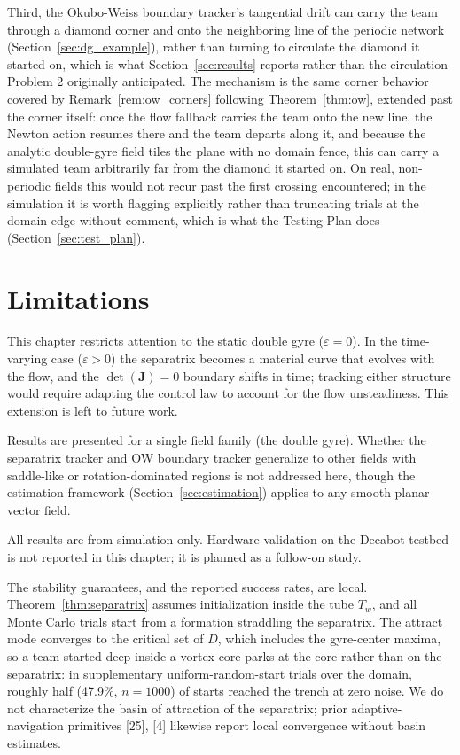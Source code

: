 \documentclass[12pt, letterpaper, oneside]{report}
\begin{document}
Third, the Okubo-Weiss boundary tracker's tangential drift can carry the
team through a diamond corner and onto the neighboring line of the
periodic network (Section~\ref{sec:dg_example}), rather than turning to
circulate the diamond it started on, which is what
Section~\ref{sec:results} reports rather than the circulation Problem 2
originally anticipated. The mechanism is the same corner behavior
covered by Remark~\ref{rem:ow_corners} following Theorem~\ref{thm:ow},
extended past the corner itself: once the flow fallback carries the team
onto the new line, the Newton action resumes there and the team departs
along it, and because the analytic double-gyre field tiles the plane
with no domain fence, this can carry a simulated team arbitrarily far
from the diamond it started on. On real, non-periodic fields this
would not recur past the first crossing encountered; in the simulation
it is worth flagging explicitly rather than truncating trials at the
domain edge without comment, which is what the Testing Plan does
(Section~\ref{sec:test_plan}).

\section{Limitations}
\label{sec:limitations}

This chapter restricts attention to the static double gyre ($\varepsilon = 0$).
In the time-varying case ($\varepsilon > 0$) the separatrix becomes a
material curve that evolves with the flow, and the $\det(\mathbf{J}) = 0$
boundary shifts in time; tracking either structure would require adapting
the control law to account for the flow unsteadiness. This extension is
left to future work.

Results are presented for a single field family (the double gyre). Whether
the separatrix tracker and OW boundary tracker generalize to other fields
with saddle-like or rotation-dominated regions is not addressed here,
though the estimation framework (Section~\ref{sec:estimation}) applies
to any smooth planar vector field.

All results are from simulation only. Hardware validation on the Decabot
testbed is not reported in this chapter; it is planned as a follow-on study.

The stability guarantees, and the reported success rates, are local.
Theorem~\ref{thm:separatrix} assumes initialization inside the tube
$T_w$, and all Monte Carlo trials start from a formation straddling the
separatrix. The attract mode converges to the critical set of $D$, which
includes the gyre-center maxima, so a team started deep inside a vortex
core parks at the core rather than on the separatrix: in supplementary
uniform-random-start trials over the domain, roughly half (47.9\%,
$n = 1000$) of starts reached the trench at zero noise. We do not
characterize the basin of attraction of the separatrix; prior
adaptive-navigation primitives [25], [4] likewise report local
convergence without basin estimates.
\end{document}
